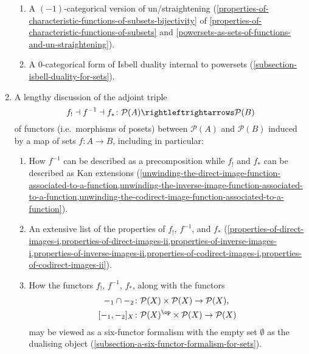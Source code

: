 \begin{enumerate}
\begin{enumerate}
            \item\label{constructions-with-sets-introduction-item-2e}A $(-1)$-categorical version of un/straightening (\cref{properties-of-characteristic-functions-of-subsets-bijectivity} of \cref{properties-of-characteristic-functions-of-subsets} and \cref{powersets-as-sets-of-functions-and-un-straightening}).
            \item\label{constructions-with-sets-introduction-item-2f}A 0-categorical form of Isbell duality internal to powersets (\cref{subsection-isbell-duality-for-sets}).
        \end{enumerate}
    \item\label{constructions-with-sets-introduction-item-3}A lengthy discussion of the adjoint triple%
        \[
            f_{!}\dashv f^{-1}\dashv f_{*}%
            \colon%
            \mathcal{P}(A)%
            \rightleftrightarrows%
            \mathcal{P}(B)%
        \]%
        of functors (i.e.\ morphisms of posets) between $\mathcal{P}(A)$ and $\mathcal{P}(B)$ induced by a map of sets $f\colon A\to B$, including in particular:
        \begin{enumerate}
            \item\label{constructions-with-sets-introduction-item-3a}How $f^{-1}$ can be described as a precomposition while $f_{!}$ and $f_{*}$ can be described as Kan extensions (\cref{unwinding-the-direct-image-function-associated-to-a-function,unwinding-the-inverse-image-function-associated-to-a-function,unwinding-the-codirect-image-function-associated-to-a-function}).
            \item\label{constructions-with-sets-introduction-item-3b}An extensive list of the properties of $f_{!}$, $f^{-1}$, and $f_{*}$ (\cref{properties-of-direct-images-i,properties-of-direct-images-ii,properties-of-inverse-images-i,properties-of-inverse-images-ii,properties-of-codirect-images-i,properties-of-codirect-images-ii}).
            \item\label{constructions-with-sets-introduction-item-3c}How the functors $f_{!}$, $f^{-1}$, $f_{*}$, along with the functors
                \begin{align*}
                    -_{1}\cap-_{2}    &\colon \mathcal{P}(X)\times\mathcal{P}(X)       \to \mathcal{P}(X),\\
                    [-_{1},-_{2}]_{X} &\colon \mathcal{P}(X)^{\op}\times\mathcal{P}(X) \to \mathcal{P}(X)
                \end{align*}
                may be viewed as a six-functor formalism with the empty set $\emptyset$ as the dualising object (\cref{subsection-a-six-functor-formalism-for-sets}).
        \end{enumerate}
\end{enumerate}

